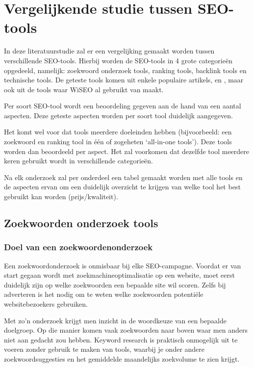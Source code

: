 \chapter{Vergelijkende studie tussen SEO-tools}
\label{ch:studie}

In deze literatuurstudie zal er een vergelijking gemaakt worden tussen verschillende SEO-tools. Hierbij worden de SEO-tools in 4 grote categorieën opgedeeld, namelijk: zoekwoord onderzoek tools, ranking tools, backlink tools en technische tools. De geteste tools komen uit enkele populaire artikels, \textcite{SEOCOMPLETE} en \textcite{SEO13}, maar ook uit de tools waar WiSEO al gebruikt van maakt. 

Per soort SEO-tool wordt een beoordeling gegeven aan de hand van een aantal aspecten. Deze geteste aspecten worden per soort tool duidelijk aangegeven. 

Het komt wel voor dat tools meerdere doeleinden hebben (bijvoorbeeld: een zoekwoord en ranking tool in één of zogeheten ‘all-in-one tools’). Deze tools worden dan beoordeeld per aspect. Het zal voorkomen dat dezelfde tool meerdere keren gebruikt wordt in verschillende categorieën. 

Na elk onderzoek zal per onderdeel een tabel gemaakt worden met alle tools en de aspecten ervan om een duidelijk overzicht te krijgen van welke tool het best gebruikt kan worden (prijs/kwaliteit). 

\section{Zoekwoorden onderzoek tools}
\label{ch: Zoekwoorden onderzoek tools}

\subsection{Doel van een zoekwoordenonderzoek}
\label{ch: Doel van een zoekwoorden onderzoek}

Een zoekwoordonderzoek is onmisbaar bij elke SEO-campagne. Voordat er van start gegaan wordt met zoekmachineoptimalisatie op een website, moet eerst duidelijk zijn op welke zoekwoorden een bepaalde site wil scoren. Zelfs bij adverteren is het nodig om te weten welke zoekwoorden potentiële websitebezoekers gebruiken. 

Met zo’n onderzoek krijgt men inzicht in de woordkeuze van een bepaalde doelgroep. Op die manier komen vaak zoekwoorden naar boven waar men anders niet aan gedacht zou hebben. Keyword research is praktisch onmogelijk uit te voeren zonder gebruik te maken van tools, waarbij je onder andere zoekwoordsuggesties en het gemiddelde maandelijks zoekvolume te zien krijgt. 

